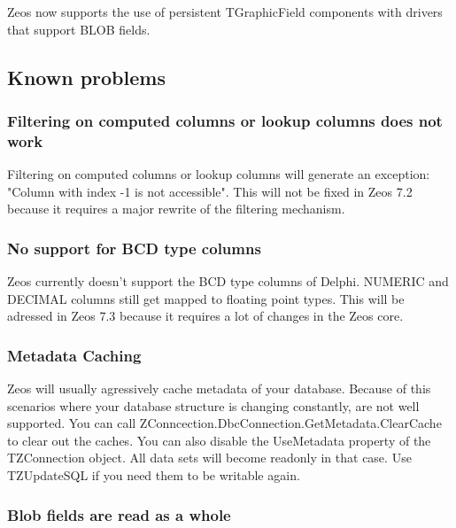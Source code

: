 \documentclass[a4paper,12pt,oneside]{book}
\begin{document}
Zeos now supports the use of persistent TGraphicField components with drivers that support BLOB fields.

\subsection{Known problems}
\label{sec:Rev6_General_KnownProblems}

\subsubsection{Filtering on computed columns or lookup columns does not work}
\label{sec:Rev6_General_KnownProblems_FilteringComputeColumnsLookupColumns}

Filtering on computed columns or lookup columns will generate an exception: "Column with index -1 is not accessible".
This will not be fixed in Zeos 7.2 because it requires a major rewrite of the filtering mechanism.

\subsubsection{No support for BCD type columns}
\label{sec:Rev6_General_KnownProblems_BCD}

Zeos currently doesn't support the BCD type columns of Delphi.
NUMERIC and DECIMAL columns still get mapped to floating point types.
This will be adressed in Zeos 7.3 because it requires a lot of changes in the Zeos core.

\subsubsection{Metadata Caching}
\label{sec:Rev6_General_KnownProblems_MetadataCaching}

Zeos will usually agressively cache metadata of your database.
Because of this scenarios where your database structure is changing constantly, are not well supported.
You can call ZConncection.\-DbcConnection.\-GetMetadata.\-ClearCache to clear out the caches.
You can also disable the UseMetadata property of the TZConnection object.
All data sets will become readonly in that case.
Use TZUpdateSQL if you need them to be writable again.

\subsubsection{Blob fields are read as a whole}
\label{sec:Rev6_General_KnownProblems_BlobFields}
\end{document}
